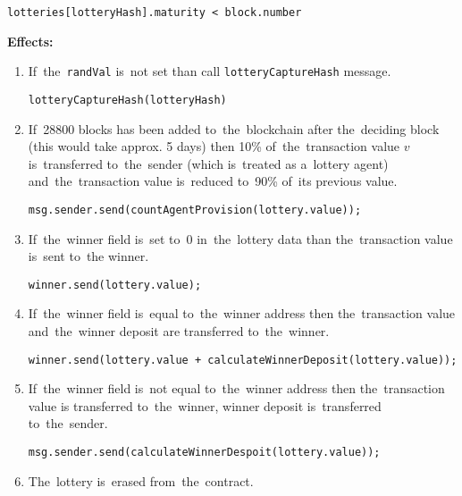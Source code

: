 \documentclass[a4paper]{article}
\begin{document}
\begin{enumerate}
\begin{enumerate}
	                \texttt{lotteries[lotteryHash].maturity < block.number}
	        \end{enumerate}
	        \textbf{Effects:}
	        \begin{enumerate}
                \item If~the~\texttt{randVal} is~not set than call \texttt{lotteryCaptureHash} message.
                    \begin{center}
                        \texttt{lotteryCaptureHash(lotteryHash)}
                    \end{center}
                \item If~28800 blocks has been added to~the~blockchain after the~deciding block (this would take
                    approx. 5 days) then 10\% of~the~transaction value $v$ is~transferred to~the~sender (which is~treated
                    as a~lottery agent) and~the~transaction value is~reduced to~90\% of~its previous value.
                    \begin{center}
                        \texttt{msg.sender.send(countAgentProvision(lottery.value));}
                    \end{center}
                \item If~the~winner field is~set to~0 in~the~lottery data than the~transaction value is~sent to~the
                    winner.
                    \begin{center}
                        \texttt{winner.send(lottery.value);}
                    \end{center}
                \item If~the~winner field is~equal to~the~winner address then the~transaction value and~the~winner
                    deposit are transferred to~the~winner.
                    \begin{center}
			            \texttt{winner.send(lottery.value + calculateWinnerDeposit(lottery.value));}
			        \end{center}
			    \item If~the~winner field is~not equal to~the~winner address then the~transaction value is
			        transferred to~the~winner, winner deposit is~transferred to~the~sender.
			        \begin{center}
			            \texttt{msg.sender.send(calculateWinnerDespoit(lottery.value));}
			        \end{center}
                \item The~lottery is~erased from~the~contract.
                    \begin{center}

\end{center}
\end{enumerate}
\end{enumerate}
\end{document}
